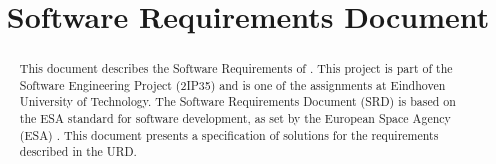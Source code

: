 

\title{Software Requirements Document}

\newcommand{\TitleFull}{Software Requirements Document}
\renewcommand{\TitelFull}{Software Requirements Document}
\renewcommand{\TitelAbbr}{SRD}
\renewcommand{\Version}{0.0}




\begin{abstract}

This document describes the Software Requirements of \projectname. This project is part of the Software Engineering Project (2IP35) and is one of the assignments at Eindhoven University of Technology. The Software Requirements Document (SRD) is based on the ESA standard for software development, as set by the European Space Agency (ESA) \cite{esa}. This document presents a specification of solutions for the requirements described in the URD.
\end{abstract}

\tableofcontents















